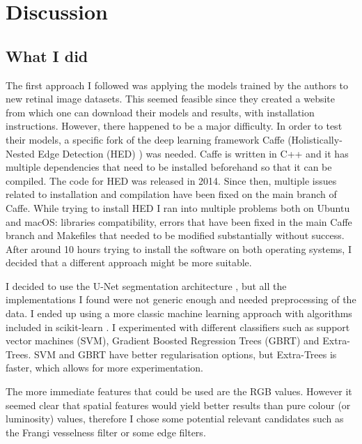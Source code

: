 \section{Discussion}


\subsection{What I did}

The first approach I followed was applying the models trained by the authors to new retinal image datasets. This seemed feasible since they created a website from which one can download their models and results, with installation instructions. However, there happened to be a major difficulty. In order to test their models, a specific fork of the deep learning framework Caffe (Holistically-Nested Edge Detection (HED) \cite{xie_holistically-nested_2015}) was needed. Caffe is written in C++ and it has multiple dependencies that need to be installed beforehand so that it can be compiled. The code for HED was released in 2014. Since then, multiple issues related to installation and compilation have been fixed on the main branch of Caffe. While trying to install HED I ran into multiple problems both on Ubuntu and macOS: libraries compatibility, errors that have been fixed in the main Caffe branch and Makefiles that needed to be modified substantially without success. After around 10 hours trying to install the software on both operating systems, I decided that a different approach might be more suitable.

I decided to use the U-Net segmentation architecture \cite{ronneberger_u-net:_2015}, but all the implementations I found were not generic enough and needed preprocessing of the data. I ended up using a more classic machine learning approach with algorithms included in scikit-learn \cite{pedregosa_scikit-learn:_2011}. I experimented with different classifiers such as support vector machines (SVM), Gradient Boosted Regression Trees (GBRT) and Extra-Trees. SVM and GBRT have better regularisation options, but Extra-Trees is faster, which allows for more experimentation.

The more immediate features that could be used are the RGB values. However it seemed clear that spatial features would yield better results than pure colour (or luminosity) values, therefore I chose some potential relevant candidates such as the Frangi vesselness filter or some edge filters.


